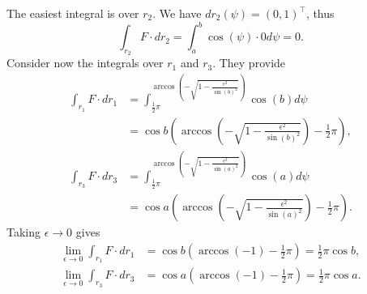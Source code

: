 \documentclass[twoside,a4paper]{article}
\theoremstyle{plain}
\theoremstyle{definition}
\theoremstyle{remark}
\numberwithin{equation}{section}
\DeclareMathOperator{\1}{\mathbbm{1}}
\begin{document}
The easiest integral is over $r_2$. We have $dr_2(\psi)=(0,1)^\top$, thus 
\[\int_{r_2}F\cdot dr_{2}=\int_a^b\cos(\psi)\cdot0d\psi=0.\]
Consider now the integrals over $r_1$ and $r_3$. They provide
\begin{align*}
\int_{r_1}F\cdot dr_1&=\int_{\frac{1}{2}\pi}^{\arccos\left(-\sqrt{1-\frac{\epsilon^2}{\sin(b)^2}}\right)}\cos (b) d\psi\\
&=\cos b\left(\arccos\left(-\sqrt{1-\frac{\epsilon^2}{\sin(b)^2}}\right)-\frac{1}{2}\pi\right),\\
\int_{r_3}F\cdot dr_3&=\int_{\frac{1}{2}\pi}^{\arccos\left(-\sqrt{1-\frac{\epsilon^2}{\sin(a)^2}}\right)}\cos (a) d\psi\\
&=\cos a\left(\arccos\left(-\sqrt{1-\frac{\epsilon^2}{\sin(a)^2}}\right)-\frac{1}{2}\pi\right).
\end{align*}
Taking $\epsilon\to0$ gives 
\begin{align*}
\lim_{\epsilon\to0}\int_{r_1}F\cdot dr_1&=\cos b\left(\arccos(-1)-\frac{1}{2}\pi\right)=\frac{1}{2}\pi\cos b,\\
\lim_{\epsilon\to0}\int_{r_3}F\cdot dr_3&=\cos a\left(\arccos(-1)-\frac{1}{2}\pi\right)=\frac{1}{2}\pi\cos a.
\end{align*}
\end{document}
